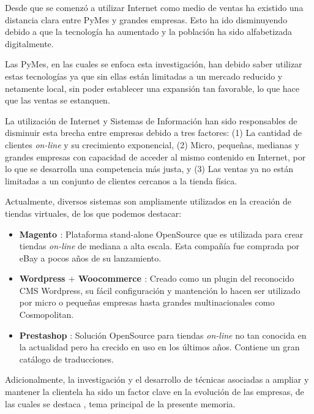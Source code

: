 Desde que se comenzó a utilizar Internet como medio de ventas ha existido una
distancia clara entre PyMes y grandes empresas. Esto ha 
ido disminuyendo debido a que la tecnología ha aumentado y la población
ha sido alfabetizada digitalmente.

Las PyMes, en las cuales se enfoca esta investigación, han debido
saber utilizar estas tecnologías ya que sin ellas están limitadas a un mercado reducido
 y netamente local, sin poder establecer una expansión tan favorable, lo que hace que las ventas se estanquen.

La utilización de Internet y Sistemas de Información han sido responsables de disminuir 
esta brecha entre empresas debido a tres factores: (1) La cantidad de clientes \emph{on-line}
y su crecimiento exponencial, (2) Micro, pequeñas, medianas y grandes empresas con capacidad
de acceder al mismo contenido en Internet, por lo que se desarrolla una competencia
más justa, y (3) Las ventas ya no están limitadas a un conjunto de clientes
cercanos a la tienda física.

Actualmente, diversos sistemas son ampliamente utilizados en la creación
de tiendas virtuales, de los que podemos destacar:

\begin{itemize}
    \item {\bf Magento \cite{Magento} }:
        Plataforma stand-alone OpenSource que es utilizada para crear tiendas \emph{on-line}
        de mediana a alta escala.
        Esta compañía fue comprada por eBay a pocos años de su lanzamiento.

    \item {\bf Wordpress \cite{Wordpress} $+$ Woocommerce \cite{Woocommerce}}:
        Creado como un plugin del reconocido CMS Wordpress, su fácil configuración
        y mantención lo hacen ser utilizado por micro o pequeñas empresas hasta
        grandes multinacionales como Cosmopolitan.

    \item {\bf Prestashop} \cite{Prestashop}:
        Solución OpenSource para tiendas \emph{on-line} no tan conocida en la actualidad
        pero ha crecido en uso en los últimos años.
        Contiene un gran catálogo de traducciones.

\end{itemize}

Adicionalmente, la investigación y el desarrollo de técnicas asociadas a ampliar
y mantener la clientela ha sido un factor clave en la evolución de las empresas,
de las cuales se destaca {\gam}, tema principal de la presente memoria.


